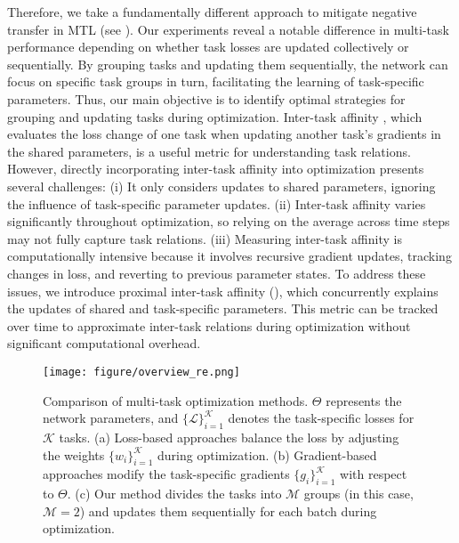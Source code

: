 Therefore, we take a fundamentally different approach to mitigate negative transfer in MTL (see ). Our experiments reveal a notable difference in multi-task performance depending on whether task losses are updated collectively or sequentially. By grouping tasks and updating them sequentially, the network can focus on specific task groups in turn, facilitating the learning of task-specific parameters. Thus, our main objective is to identify optimal strategies for grouping and updating tasks during optimization. Inter-task affinity \citep{fifty2021efficiently}, which evaluates the loss change of one task when updating another task's gradients in the shared parameters, is a useful metric for understanding task relations. However, directly incorporating inter-task affinity into optimization presents several challenges: (i) It only considers updates to shared parameters, ignoring the influence of task-specific parameter updates. (ii) Inter-task affinity varies significantly throughout optimization, so relying on the average across time steps may not fully capture task relations. (iii) Measuring inter-task affinity is computationally intensive because it involves recursive gradient updates, tracking changes in loss, and reverting to previous parameter states. To address these issues, we introduce proximal inter-task affinity (), which concurrently explains the updates of shared and task-specific parameters. This metric can be tracked over time to approximate inter-task relations during optimization without significant computational overhead.


\begin{figure}[t]
    \centering
    \texttt{[image: figure/overview\_re.png]}
    \caption{Comparison of multi-task optimization methods. $\Theta$ represents the network parameters, and $\{\mathcal{L}\}_{i=1}^{\mathcal{K}}$ denotes the task-specific losses for $\mathcal{K}$ tasks. (a) Loss-based approaches balance the loss by adjusting the weights $\{w_i\}_{i=1}^{\mathcal{K}}$ during optimization. (b) Gradient-based approaches modify the task-specific gradients $\{g_i\}_{i=1}^{\mathcal{K}}$ with respect to $\Theta$. (c) Our method divides the tasks into $\mathcal{M}$ groups (in this case, $\mathcal{M}=2$) and updates them sequentially for each batch during optimization.}
    \vspace{-5pt}
    \label{fig:overview}
\end{figure}

